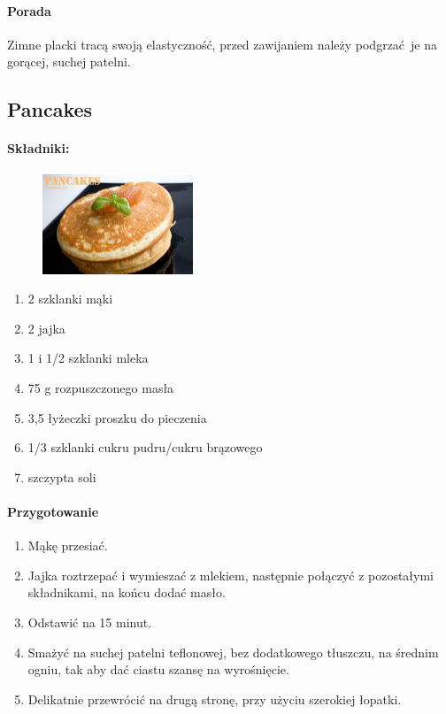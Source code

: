 \documentclass{article}
\begin{document}
    \paragraph{Porada}
    Zimne placki tracą swoją elastyczność, przed zawijaniem należy podgrzać je
    na gorącej, suchej patelni.
    \newpage

    \subsection{Pancakes}
    \bigskip
    \paragraph{Składniki:}
    \begin{figure}
        \includegraphics[width=0.4\textwidth]{pancakes.jpg}
    \end{figure}
    \begin{enumerate}
        \item 2 szklanki mąki
        \item 2 jajka
        \item 1 i 1/2 szklanki mleka
        \item 75 g rozpuszczonego masła
        \item 3,5 łyżeczki proszku do pieczenia
        \item 1/3 szklanki cukru pudru/cukru brązowego
        \item szczypta soli
    \end{enumerate}

    \paragraph{Przygotowanie}
    \begin{enumerate}
        \item Mąkę przesiać.
        \item Jajka roztrzepać i wymieszać z mlekiem, następnie połączyć z
            pozostałymi składnikami, na końcu dodać masło.
        \item Odstawić na 15 minut.
        \item Smażyć na suchej patelni teflonowej, bez dodatkowego tłuszczu, na
            średnim ogniu, tak aby dać ciastu szansę na wyrośnięcie.
        \item Delikatnie przewrócić na drugą stronę, przy użyciu szerokiej
            łopatki.
    \end{enumerate}
    \newpage
\end{document}
